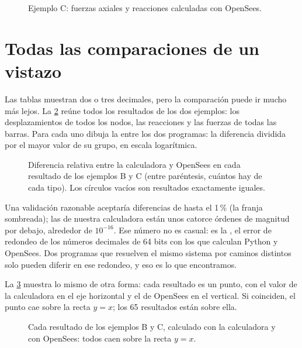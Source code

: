 \begin{figure}[ht]
  \centering
  \caption{Ejemplo C: fuerzas axiales y reacciones calculadas con OpenSees.}
  \label{fig:d_c_axiales}
\end{figure}

\FloatBarrier

\section{Todas las comparaciones de un vistazo}\label{sec:d_vistazo}

Las tablas muestran dos o tres decimales, pero la comparación puede ir mucho
más lejos. La \cref{fig:d_diferencias} reúne todos los resultados de los dos
ejemplos: los desplazamientos de todos los nodos, las reacciones y las fuerzas
de todas las barras. Para cada uno dibuja la 
entre los dos programas: la diferencia dividida por el mayor valor de su
grupo, en escala logarítmica.

\begin{figure}[ht]
  \centering
  \caption{Diferencia relativa entre la calculadora y OpenSees en cada
    resultado de los ejemplos B y C (entre paréntesis, cuántos hay de cada
    tipo). Los círculos vacíos son resultados exactamente iguales.}
  \label{fig:d_diferencias}
\end{figure}

Una validación razonable aceptaría diferencias de hasta el 1\,\% (la franja
sombreada); las de nuestra calculadora están unos catorce órdenes de magnitud
por debajo, alrededor de $10^{-16}$. Ese número no es casual: es la
, el error de redondeo de los números
decimales de 64 bits con los que calculan Python y OpenSees. Dos programas que
resuelven el mismo sistema por caminos distintos solo pueden diferir en ese
redondeo, y eso es lo que encontramos.

La \cref{fig:d_paridad} muestra lo mismo de otra forma: cada resultado es un
punto, con el valor de la calculadora en el eje horizontal y el de OpenSees en
el vertical. Si coinciden, el punto cae sobre la recta $y = x$; los 65
resultados están sobre ella.

\begin{figure}[ht]
  \centering
  \caption{Cada resultado de los ejemplos B y C, calculado con la calculadora
    y con OpenSees: todos caen sobre la recta $y = x$.}
  \label{fig:d_paridad}
\end{figure}

